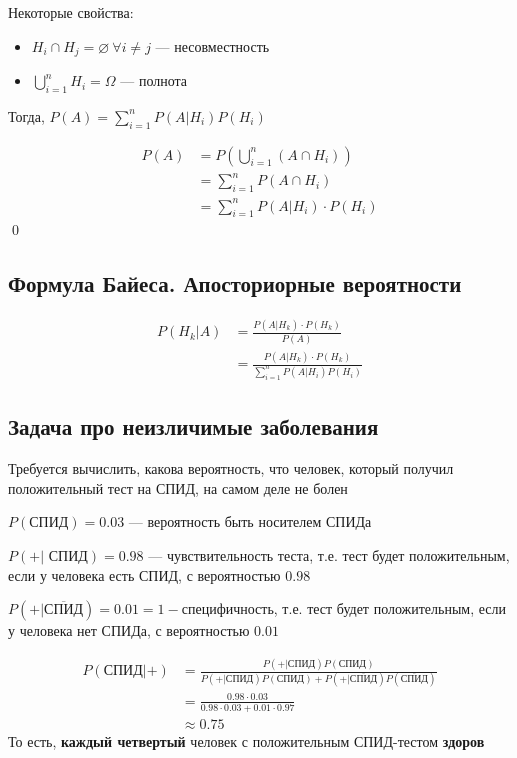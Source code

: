 \documentclass[a4paper, 10pt]{article}
\begin{document}
Некоторые свойства:
\begin{itemize}
    \item $H_i\cap H_j=\varnothing\ \forall i\ne j$ — несовместность\\[1mm]
    \item $\displaystyle\bigcup_{i=1}^{n}H_i=\Omega$ — полнота
\end{itemize}

\theorem Тогда, $P(A)=\sum_{i=1}^{n}P(A|H_i)P(H_i)$

\proof
\begin{equation*}
    \begin{aligned}
        P(A)&=P\left(\bigcup_{i=1}^{n}(A\cap H_i)\right)\\
        &=\sum_{i=1}^{n}P(A\cap H_i)\\
        &=\sum_{i=1}^{n} P(A|H_i)\cdot P(H_i)
    \end{aligned}
\end{equation*}\qed

\subsection{Формула Байеса. Апосториорные вероятности}
\begin{equation*}
    \begin{aligned}
        P(H_k|A)&=\frac{P(A|H_k)\cdot P(H_k)}{P(A)}\\
        &=\frac{P(A|H_k)\cdot P(H_k)}{\sum_{i=1}^{n} P(A|H_i)P(H_i)}
    \end{aligned}
\end{equation*}

\subsection{Задача про неизличимые заболевания}
Требуется вычислить, какова вероятность, что человек, который получил положительный тест на СПИД, на самом деле не болен

$P(\text{СПИД})=0.03$ — вероятность быть носителем СПИДа

$P(+|\text{ СПИД})=0.98$ — чувствительность теста, т.е. тест будет положительным, если у человека есть СПИД, с вероятностью $0.98$

$P(+|\overline{\text{СПИД}})=0.01=1-\text{специфичность}$, т.е. тест будет положительным, если у человека нет СПИДа, с вероятностью $0.01$

\begin{equation*}
    \begin{aligned}
        P(\text{СПИД}|+)&=\displaystyle\frac{P(+|\text{СПИД})P(\text{СПИД})}{P(+|\text{СПИД})P(\text{СПИД})+P(+|\overline{\text{СПИД}})P(\overline{\text{СПИД}})}\\
        &=\frac{0.98\cdot0.03}{0.98\cdot0.03+0.01\cdot0.97}\\
        &\approx0.75
    \end{aligned}
\end{equation*}
То есть, \textbf{каждый четвертый} человек с положительным СПИД-тестом \textbf{здоров}
\end{document}
